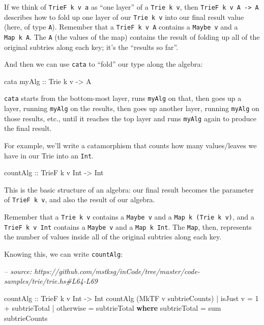 \documentclass[]{article}
\newenvironment{Shaded}{}{}
\newcommand{\CommentTok}[1]{\textcolor[rgb]{0.38,0.63,0.69}{\textit{#1}}}
\newcommand{\DataTypeTok}[1]{\textcolor[rgb]{0.56,0.13,0.00}{#1}}
\newcommand{\DecValTok}[1]{\textcolor[rgb]{0.25,0.63,0.44}{#1}}
\newcommand{\FunctionTok}[1]{\textcolor[rgb]{0.02,0.16,0.49}{#1}}
\newcommand{\KeywordTok}[1]{\textcolor[rgb]{0.00,0.44,0.13}{\textbf{#1}}}
\newcommand{\NormalTok}[1]{#1}
\newcommand{\OtherTok}[1]{\textcolor[rgb]{0.00,0.44,0.13}{#1}}
\begin{document}
If we think of \texttt{TrieF\ k\ v\ a} as ``one layer'' of a
\texttt{Trie\ k\ v}, then \texttt{TrieF\ k\ v\ A\ -\textgreater{}\ A} describes
how to fold up one layer of our \texttt{Trie\ k\ v} into our final result value
(here, of type \texttt{A}). Remember that a \texttt{TrieF\ k\ v\ A} contains a
\texttt{Maybe\ v} and a \texttt{Map\ k\ A}. The \texttt{A} (the values of the
map) contains the result of folding up all of the original subtries along each
key; it's the ``results so far''.

And then we can use \texttt{cata} to ``fold'' our type along the algebra:

\begin{Shaded}
\begin{Highlighting}[]
\NormalTok{cata}\OtherTok{ myAlg ::} \DataTypeTok{Trie}\NormalTok{ k v }\OtherTok{->} \DataTypeTok{A}
\end{Highlighting}
\end{Shaded}

\texttt{cata} starts from the bottom-most layer, runs \texttt{myAlg} on that,
then goes up a layer, running \texttt{myAlg} on the results, then goes up
another layer, running \texttt{myAlg} on those results, etc., until it reaches
the top layer and runs \texttt{myAlg} again to produce the final result.

For example, we'll write a catamorphism that counts how many values/leaves we
have in our Trie into an \texttt{Int}.

\begin{Shaded}
\begin{Highlighting}[]
\OtherTok{countAlg ::} \DataTypeTok{TrieF}\NormalTok{ k v }\DataTypeTok{Int} \OtherTok{->} \DataTypeTok{Int}
\end{Highlighting}
\end{Shaded}

This is the basic structure of an algebra: our final result becomes the
parameter of \texttt{TrieF\ k\ v}, and also the result of our algebra.

Remember that a \texttt{Trie\ k\ v} contains a \texttt{Maybe\ v} and a
\texttt{Map\ k\ (Trie\ k\ v)}, and a \texttt{TrieF\ k\ v\ Int} contains a
\texttt{Maybe\ v} and a \texttt{Map\ k\ Int}. The \texttt{Map}, then, represents
the number of values inside all of the original subtries along each key.

Knowing this, we can write \texttt{countAlg}:

\begin{Shaded}
\begin{Highlighting}[]
\CommentTok{-- source: https://github.com/mstksg/inCode/tree/master/code-samples/trie/trie.hs#L64-L69}

\OtherTok{countAlg ::} \DataTypeTok{TrieF}\NormalTok{ k v }\DataTypeTok{Int} \OtherTok{->} \DataTypeTok{Int}
\NormalTok{countAlg (}\DataTypeTok{MkTF}\NormalTok{ v subtrieCounts)}
    \FunctionTok{|}\NormalTok{ isJust v  }\FunctionTok{=} \DecValTok{1} \FunctionTok{+}\NormalTok{ subtrieTotal}
    \FunctionTok{|}\NormalTok{ otherwise }\FunctionTok{=}\NormalTok{ subtrieTotal}
  \KeywordTok{where}
\NormalTok{    subtrieTotal }\FunctionTok{=}\NormalTok{ sum subtrieCounts}
\end{Highlighting}
\end{Shaded}
\end{document}
